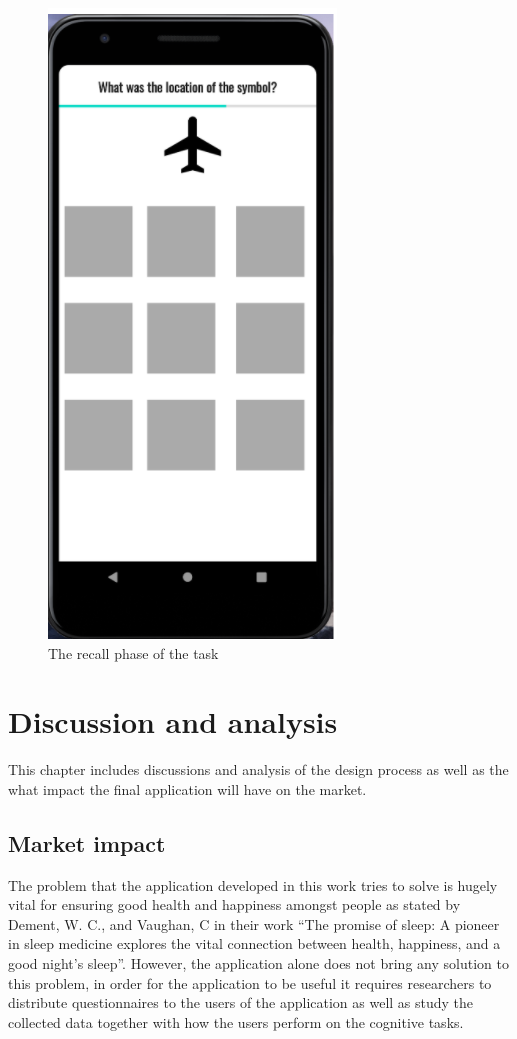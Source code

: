 \documentclass{article}
\begin{document}
\begin{figure}[!h]
  \begin{center}
    \includegraphics[scale=0.8]{Android6.png}
    \caption{The recall phase of the task
}
    \label{fig:android6}
  \end{center}
\end{figure}


\section{Discussion and analysis}

This chapter includes discussions and analysis of the design process as well as the what impact the final application will have on the market. 

\subsection{Market impact}

The problem that the application developed in this work tries to solve is hugely vital for ensuring good health and happiness amongst people as stated by Dement, W. C., and Vaughan, C in their work “The promise of sleep: A pioneer in sleep medicine explores the vital connection between health, happiness, and a good night's sleep”.\cite{dement_promise_1999} However, the application alone does not bring any solution to this problem, in order for the application to be useful it requires researchers to distribute questionnaires to the users of the application as well as study the collected data together with how the users perform on the cognitive tasks. 
\end{document}
